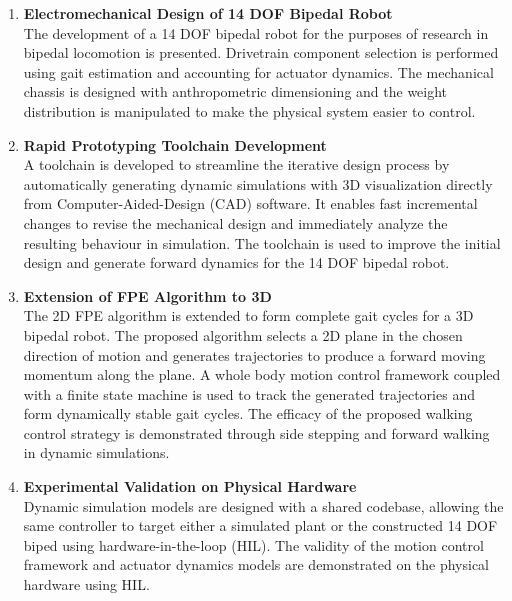 \begin{enumerate}
	\item \textbf{Electromechanical Design of 14 DOF Bipedal Robot} \\ 
	The development of a 14 DOF bipedal robot for the purposes of research in bipedal locomotion is presented. Drivetrain component selection is performed using gait estimation and accounting for actuator dynamics. The mechanical chassis is designed with anthropometric dimensioning and the weight distribution is manipulated to make the physical system easier to control.  \\

	\item \textbf{Rapid Prototyping Toolchain Development} \\ 
	A toolchain is developed to streamline the iterative design process by automatically generating dynamic simulations with 3D visualization directly from Computer-Aided-Design (CAD) software. It enables fast incremental changes to revise the mechanical design and immediately analyze the resulting behaviour in simulation. The toolchain is used to improve the initial design and generate forward dynamics for the 14 DOF bipedal robot. \\

	\item \textbf{Extension of FPE Algorithm to 3D} \\ 
	The 2D FPE algorithm is extended to form complete gait cycles for a 3D bipedal robot. The proposed algorithm selects a 2D plane in the chosen direction of motion and generates trajectories to produce a forward moving momentum along the plane. A whole body motion control framework coupled with a finite state machine is used to track the generated trajectories and form dynamically stable gait cycles. The efficacy of the proposed walking control strategy is demonstrated through side stepping and forward walking in dynamic simulations. \\

	\item \textbf{Experimental Validation on Physical Hardware} \\ 
	Dynamic simulation models are designed with a shared codebase, allowing the same controller to target either a simulated plant or the constructed 14 DOF biped using hardware-in-the-loop (HIL). The validity of the motion control framework and actuator dynamics models are demonstrated on the physical hardware using HIL. \\

\end{enumerate}

